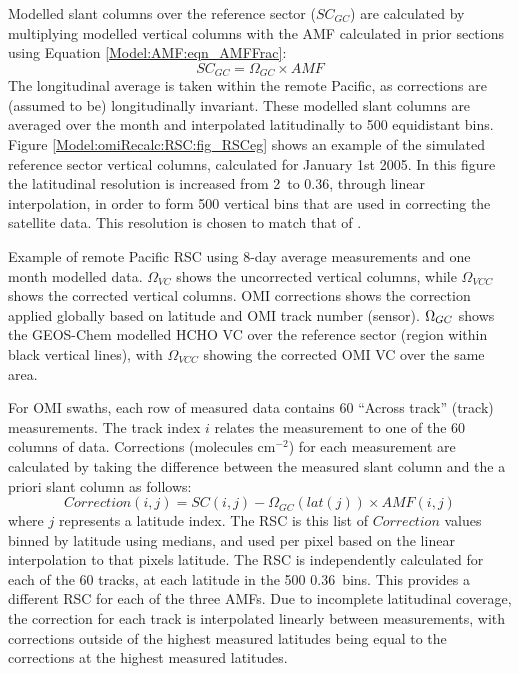     
    Modelled slant columns over the reference sector ($SC_{GC}$) are calculated by multiplying modelled vertical columns with the AMF calculated in prior sections using Equation \ref{Model:AMF:eqn_AMFFrac}: 
    \begin{equation*}
      SC_{GC} = \Omega_{GC} \times AMF
    \end{equation*}
    The longitudinal average is taken within the remote Pacific, as corrections are (assumed to be) longitudinally invariant.
    These modelled slant columns are averaged over the month and interpolated latitudinally to 500 equidistant bins.
    Figure \ref{Model:omiRecalc:RSC:fig_RSCeg} shows an example of the simulated reference sector vertical columns, calculated for January 1st 2005.
    In this figure the latitudinal resolution is increased from 2\degr ~to 0.36\degr, through linear interpolation, in order to form 500 vertical bins that are used in correcting the satellite data.
    This resolution is chosen to match that of \textcite{Abad2016}.
    
    
    {%
      Example of remote Pacific RSC using 8-day average measurements and one month modelled data.
      $\Omega_{VC}$ shows the uncorrected vertical columns, while $\Omega_{VCC}$ shows the corrected vertical columns.
      OMI corrections shows the correction applied globally based on latitude and OMI track number (sensor).
      $\Omega_{GC}$ shows the GEOS-Chem modelled HCHO VC over the reference sector (region within black vertical lines), with $\Omega_{VCC}$ showing the corrected OMI VC over the same area.
    }
    {\label{Model:omiRecalc:RSC:fig_RSCeg}}
    
    
    For OMI swaths, each row of measured data contains 60 ``Across track'' (track) measurements.
    The track index $i$ relates the measurement to one of the 60 columns of data.
    Corrections (molecules cm$^{-2}$) for each measurement are calculated by taking the difference between the measured slant column and the a priori slant column as follows:
    \begin{equation} \label{Model:omiRecalc:eqn_RSC}
      Correction(i,j) = SC(i,j) - \Omega_{GC}(lat(j)) \times {AMF}(i,j)
    \end{equation}
    where $j$ represents a latitude index.
    The RSC is this list of $Correction$ values binned by latitude using medians, and used per pixel based on the linear interpolation to that pixels latitude.
    The RSC is independently calculated for each of the 60 tracks, at each latitude in the 500 0.36\degr ~bins.
    This provides a different RSC for each of the three AMFs.
    Due to incomplete latitudinal coverage, the correction for each track is interpolated linearly between measurements, with corrections outside of the highest measured latitudes being equal to the corrections at the highest measured latitudes.
    
